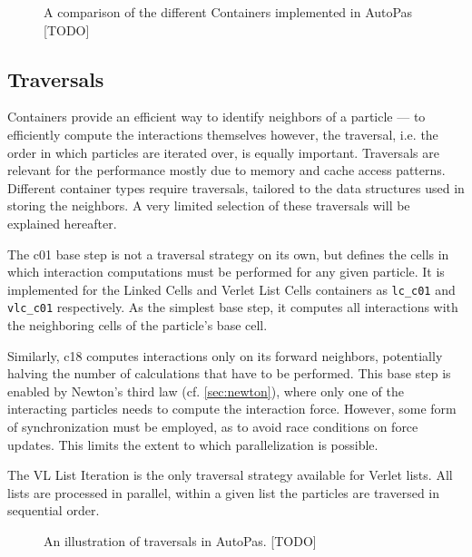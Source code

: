 \begin{figure}
	\centering
	\caption{A comparison of the different Containers implemented in AutoPas [TODO]}
	\label{fig:containers}
\end{figure}

\subsection{Traversals}
\label{sec:traversals}
Containers provide an efficient way to identify neighbors of a particle --- to efficiently compute the interactions themselves however, the traversal, i.e. the order in which particles are iterated over, is equally important. Traversals are relevant for the performance mostly due to memory and cache access patterns. Different container types require traversals, tailored to the data structures used in storing the neighbors. A very limited selection of these traversals will be explained hereafter.

\begin{description}[leftmargin=!,labelwidth=\widthof{\textbf{VL List Iteration}}]
\item[\textbf{C01 Base Step}] The c01 base step is not a traversal strategy on its own, but defines the cells in which interaction computations must be performed for any given particle. It is implemented for the Linked Cells and Verlet List Cells containers as \texttt{lc\_c01} and \texttt{vlc\_c01} respectively. As the simplest base step, it computes all interactions with the neighboring cells of the particle’s base cell.
\item[\textbf{C18 Base Step}] Similarly, c18 computes interactions only on its forward neighbors, potentially halving the number of calculations that have to be performed. This base step is enabled by Newton's third law (cf. \autoref{sec:newton}), where only one of the interacting particles needs to compute the interaction force. However, some form of synchronization must be employed, as to avoid race conditions on force updates. This limits the extent to which parallelization is possible. 
\item[\textbf{VL List Iteration}] The VL List Iteration is the only traversal strategy available for Verlet lists. All lists are processed in parallel, within a given list the particles are traversed in sequential order. %
\end{description}

\begin{figure}
	\centering
	\caption{An illustration of traversals in AutoPas. [TODO]}
	\label{fig:traversals}
\end{figure}

